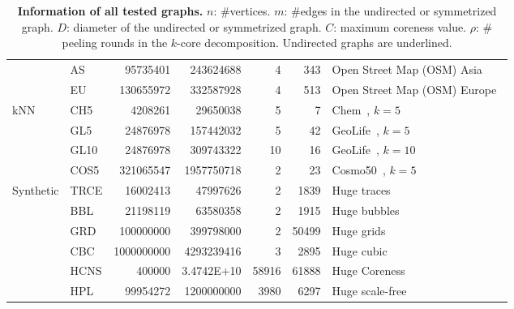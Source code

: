 \begin{table*}[htbp]
\begin{tabular}{rlrrrrl}
              & AS    & 95735401 & 243624688 & 4     & 343   & Open Street Map (OSM) Asia~\cite{roadgraph} \\
              & EU    & 130655972 & 332587928 & 4     & 513   & Open Street Map (OSM) Europe~\cite{roadgraph} \\
        \midrule
        \multicolumn{1}{l}{kNN} & CH5   & 4208261 & 29650038 & 5     & 7     & Chem~\cite{fonollosa2015reservoir,wang2021geograph}, $k=5$ \\
              & GL5   & 24876978 & 157442032 & 5     & 42    & GeoLife~\cite{geolife,wang2021geograph}, $k=5$ \\
              & GL10  & 24876978 & 309743322 & 10    & 16    & GeoLife~\cite{geolife,wang2021geograph}, $k=10$ \\
              & COS5  & 321065547 & 1957750718 & 2     & 23    & Cosmo50~\cite{cosmo50,wang2021geograph}, $k=5$ \\
        \midrule
        \multicolumn{1}{l}{Synthetic} & TRCE  & 16002413 & 47997626 & 2     & 1839  & Huge traces~\cite{nr} \\
              & BBL   & 21198119 & 63580358 & 2     & 1915  & Huge bubbles~\cite{nr} \\
              & GRD   & 100000000 & 399798000 & 2     & 50499 & Huge grids~\cite{nr} \\
              & CBC   & 1000000000 & 4293239416 & 3     & 2895  & Huge cubic~\cite{nr} \\
              & HCNS  & 400000 & 3.4742E+10 & 58916 & 61888 & Huge Coreness ~\cite{nr} \\
              & HPL   & 99954272 & 1200000000 & 3980  & 6297  & Huge scale-free ~\cite{nr} \\
        \bottomrule
        \end{tabular}%

    
    \vspace{1em}
      \caption{\textbf{Information of all tested graphs.} 
      $n$: \#vertices.
      $m$: \#edges in the undirected or symmetrized graph. 
      $D$: diameter of the undirected or symmetrized graph. 
      $C$: maximum coreness value.
      $\rho$: \# peeling rounds in the $k$-core decomposition.
      Undirected graphs are underlined.
      }
  \end{table*}%
